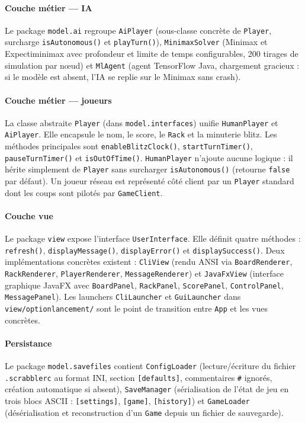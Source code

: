\documentclass[a4paper]{article}
\begin{document}
\paragraph{Couche métier --- IA}
Le package \texttt{model.ai} regroupe \texttt{AiPlayer} (sous-classe concrète de \texttt{Player}, surcharge \texttt{isAutonomous()} et \texttt{playTurn()}), \texttt{MinimaxSolver} (Minimax et Expectiminimax avec profondeur et limite de temps configurables, 200 tirages de simulation par nœud) et \texttt{MlAgent} (agent TensorFlow Java, chargement gracieux : si le modèle est absent, l'IA se replie sur le Minimax sans crash).

\paragraph{Couche métier --- joueurs}
La classe abstraite \texttt{Player} (dans \texttt{model.interfaces}) unifie \texttt{HumanPlayer} et \texttt{AiPlayer}. Elle encapsule le nom, le score, le \texttt{Rack} et la minuterie blitz. Les méthodes principales sont \texttt{enableBlitzClock()}, \texttt{startTurnTimer()}, \texttt{pauseTurnTimer()} et \texttt{isOutOfTime()}. \texttt{HumanPlayer} n'ajoute aucune logique : il hérite simplement de \texttt{Player} sans surcharger \texttt{isAutonomous()} (retourne \texttt{false} par défaut). Un joueur réseau est représenté côté client par un \texttt{Player} standard dont les coups sont pilotés par \texttt{GameClient}.

\paragraph{Couche vue}
Le package \texttt{view} expose l'interface \texttt{UserInterface}. Elle définit quatre méthodes : \texttt{refresh()}, \texttt{displayMessage()}, \texttt{displayError()} et \texttt{displaySuccess()}. Deux implémentations concrètes existent : \texttt{CliView} (rendu ANSI via \texttt{BoardRenderer}, \texttt{RackRenderer}, \texttt{PlayerRenderer}, \texttt{MessageRenderer}) et \texttt{JavaFxView} (interface graphique JavaFX avec \texttt{BoardPanel}, \texttt{RackPanel}, \texttt{ScorePanel}, \texttt{ControlPanel}, \texttt{MessagePanel}). Les launchers \texttt{CliLauncher} et \texttt{GuiLauncher} dans \texttt{view/optionlancement/} sont le point de transition entre \texttt{App} et les vues concrètes.

\paragraph{Persistance}
Le package \texttt{model.savefiles} contient \texttt{ConfigLoader} (lecture/écriture du fichier \texttt{.scrabblerc} au format INI, section \texttt{[defaults]}, commentaires \texttt{\#} ignorés, création automatique si absent), \texttt{SaveManager} (sérialisation de l'état de jeu en trois blocs ASCII : \texttt{[settings]}, \texttt{[game]}, \texttt{[history]}) et \texttt{GameLoader} (désérialisation et reconstruction d'un \texttt{Game} depuis un fichier de sauvegarde).
\end{document}
